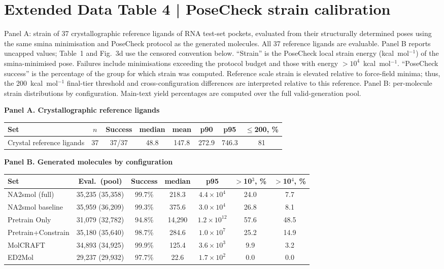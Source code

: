 \section*{Extended Data Table 4 | PoseCheck strain calibration}
Panel A: strain of 37 crystallographic reference ligands of RNA test-set pockets, evaluated from their structurally determined poses using the same smina minimisation and PoseCheck protocol as the generated molecules. All 37 reference ligands are evaluable. Panel B reports uncapped values; Table~1 and Fig.~3d use the censored convention below. ``Strain'' is the PoseCheck local strain energy (kcal~mol$^{-1}$) of the smina-minimised pose. Failures include minimisations exceeding the protocol budget and those with energy $>10^{4}$~kcal~mol$^{-1}$. ``PoseCheck success'' is the percentage of the group for which strain was computed. Reference scale strain is elevated relative to force-field minima; thus, the 200~kcal~mol$^{-1}$ final-tier threshold and cross-configuration differences are interpreted relative to this reference. Panel B: per-molecule strain distributions by configuration. Main-text yield percentages are computed over the full valid-generation pool.

\textbf{Panel A. Crystallographic reference ligands}
\begin{center}\footnotesize
\setlength{\tabcolsep}{5pt}
\begin{tabular}{@{}lccccccc@{}}
\toprule
\textbf{Set} & \textbf{$n$} & \textbf{Success} & \textbf{median} & \textbf{mean} & \textbf{p90} & \textbf{p95} & \textbf{$\le$200, \%} \\
\midrule
Crystal reference ligands & 37 & 37/37 & 48.8 & 147.8 & 272.9 & 746.3 & 81 \\
\bottomrule
\end{tabular}\end{center}

\textbf{Panel B. Generated molecules by configuration}
\begin{center}\scriptsize
\setlength{\tabcolsep}{2.5pt}
\begin{tabular}{@{}lcccccc@{}}
\toprule
\textbf{Set} & \textbf{Eval.\ (pool)} & \textbf{Success} & \textbf{median} & \textbf{p95} & \textbf{$>$10$^{3}$, \%} & \textbf{$>$10$^{4}$, \%} \\
\midrule
NA2smol (full)      & 35,235 (35,358) & 99.7\% & 218.3  & $4.4\times10^{4}$ & 24.0 & 7.7 \\
NA2smol baseline    & 35,959 (36,209) & 99.3\% & 375.6  & $3.0\times10^{4}$ & 26.8 & 8.1 \\
Pretrain Only       & 31,079 (32,782) & 94.8\% & 14,290 & $1.2\times10^{12}$ & 57.6 & 48.5 \\
Pretrain+Constrain  & 35,180 (35,640) & 98.7\% & 284.6  & $1.0\times10^{7}$ & 25.2 & 14.9 \\
\midrule
MolCRAFT            & 34,893 (34,925) & 99.9\% & 125.4  & $3.6\times10^{3}$ & 9.9 & 3.2 \\
ED2Mol              & 29,237 (29,932) & 97.7\% & 22.6   & $1.7\times10^{2}$ & 0.0 & 0.0 \\
\bottomrule
\end{tabular}\end{center}

